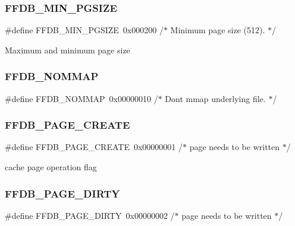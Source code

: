 \subsubsection{\texorpdfstring{FFDB\_MIN\_PGSIZE}{FFDB\_MIN\_PGSIZE}}
{\footnotesize\ttfamily \#define F\+F\+D\+B\+\_\+\+M\+I\+N\+\_\+\+P\+G\+S\+I\+ZE~0x000200   /$\ast$ Minimum page size (512). $\ast$/}

Maximum and minimum page size \mbox{\label{adat-devel_2other__libs_2filedb_2filehash_2ffdb__pagepool_8h_a6287665e8a01d5bb20d053bb730b87fc}} 
\subsubsection{\texorpdfstring{FFDB\_NOMMAP}{FFDB\_NOMMAP}}
{\footnotesize\ttfamily \#define F\+F\+D\+B\+\_\+\+N\+O\+M\+M\+AP~0x00000010    /$\ast$ Don\textquotesingle{}t mmap underlying file. $\ast$/}

\mbox{\label{adat-devel_2other__libs_2filedb_2filehash_2ffdb__pagepool_8h_a13c5fd155bd487e656eb2779f4d805a3}} 
\subsubsection{\texorpdfstring{FFDB\_PAGE\_CREATE}{FFDB\_PAGE\_CREATE}}
{\footnotesize\ttfamily \#define F\+F\+D\+B\+\_\+\+P\+A\+G\+E\+\_\+\+C\+R\+E\+A\+TE~0x00000001	/$\ast$ page needs to be written $\ast$/}

cache page operation flag \mbox{\label{adat-devel_2other__libs_2filedb_2filehash_2ffdb__pagepool_8h_a83fd5f8f5dfac0274251820d9726c2ea}} 
\subsubsection{\texorpdfstring{FFDB\_PAGE\_DIRTY}{FFDB\_PAGE\_DIRTY}}
{\footnotesize\ttfamily \#define F\+F\+D\+B\+\_\+\+P\+A\+G\+E\+\_\+\+D\+I\+R\+TY~0x00000002	/$\ast$ page needs to be written $\ast$/}

